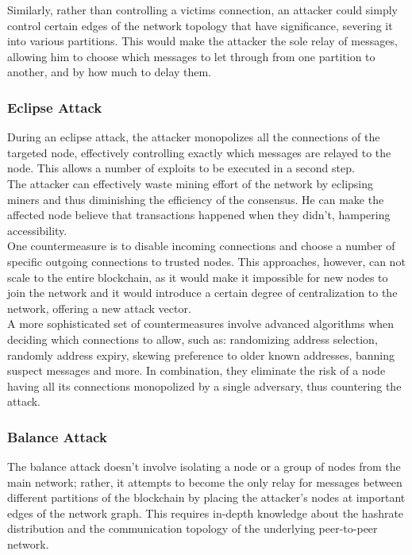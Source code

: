 \documentclass[12pt,a4paper]{article}
\begin{document}
Similarly, rather than controlling a victims connection, an attacker could simply control certain edges of the network topology that have significance, severing it into various partitions. This would make the attacker the sole relay of messages, allowing him to choose which messages to let through from one partition to another, and by how much to delay them.\\

\subsubsection{Eclipse Attack}

During an eclipse attack, the attacker monopolizes all the connections of the targeted node, effectively controlling exactly which messages are relayed to the node. This allows a number of exploits to be executed in a second step.\\

The attacker can effectively waste mining effort of the network by eclipsing miners and thus diminishing the efficiency of the \gls{consensus}. He can make the affected node believe that transactions happened when they didn't, hampering accessibility.\\

One countermeasure is to disable incoming connections and choose a number of specific outgoing connections to trusted nodes. This approaches, however, can not scale to the entire \gls{blockchain}, as it would make it impossible for new nodes to join the network and it would introduce a certain degree of centralization to the network, offering a new attack vector.\\

A more sophisticated set of countermeasures involve advanced algorithms when deciding which connections to allow, such as: randomizing address selection, randomly address expiry, skewing preference to older known addresses, banning suspect messages and more. In combination, they eliminate the risk of a node having all its connections monopolized by a single adversary, thus countering the attack.\\

\subsubsection{Balance Attack}

The balance attack doesn't involve isolating a node or a group of nodes from the main network; rather, it attempts to become the only relay for messages between different partitions of the \gls{blockchain} by placing the attacker's nodes at important edges of the network graph. This requires in-depth knowledge about the \gls{hashrate} distribution and the communication topology of the underlying peer-to-peer network.\\
\end{document}

